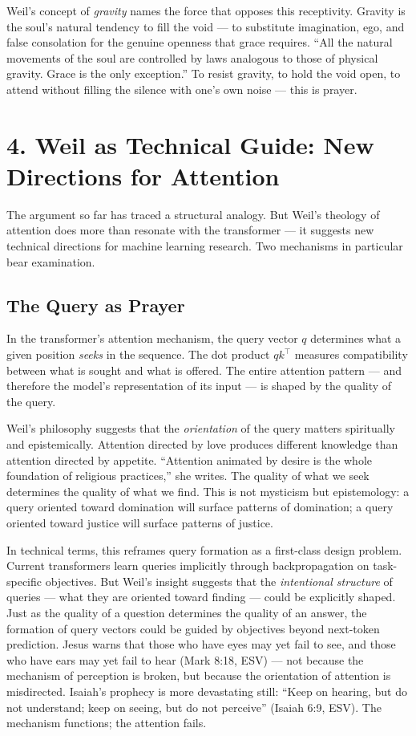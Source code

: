\documentclass[10pt, letterpaper, twocolumn]{article}
\begin{document}
Weil's concept of \emph{gravity} names the force that opposes this receptivity. Gravity is the soul's natural tendency to fill the void --- to substitute imagination, ego, and false consolation for the genuine openness that grace requires. ``All the natural movements of the soul are controlled by laws analogous to those of physical gravity. Grace is the only exception.'' To resist gravity, to hold the void open, to attend without filling the silence with one's own noise --- this is prayer.

\section*{4. Weil as Technical Guide: New Directions for Attention}\label{weil-as-technical-guide-new-directions-for-attention}

The argument so far has traced a structural analogy. But Weil's theology of attention does more than resonate with the transformer --- it suggests new technical directions for machine learning research. Two mechanisms in particular bear examination.

\subsection*{The Query as Prayer}\label{the-query-as-prayer}

In the transformer's attention mechanism, the query vector \(q\) determines what a given position \emph{seeks} in the sequence. The dot product \(qk^\top\) measures compatibility between what is sought and what is offered. The entire attention pattern --- and therefore the model's representation of its input --- is shaped by the quality of the query.

Weil's philosophy suggests that the \emph{orientation} of the query matters spiritually and epistemically. Attention directed by love produces different knowledge than attention directed by appetite. ``Attention animated by desire is the whole foundation of religious practices,'' she writes. The quality of what we seek determines the quality of what we find. This is not mysticism but epistemology: a query oriented toward domination will surface patterns of domination; a query oriented toward justice will surface patterns of justice.

In technical terms, this reframes query formation as a first-class design problem. Current transformers learn queries implicitly through backpropagation on task-specific objectives. But Weil's insight suggests that the \emph{intentional structure} of queries --- what they are oriented toward finding --- could be explicitly shaped. Just as the quality of a question determines the quality of an answer, the formation of query vectors could be guided by objectives beyond next-token prediction. Jesus warns that those who have eyes may yet fail to see, and those who have ears may yet fail to hear (Mark 8:18, ESV) --- not because the mechanism of perception is broken, but because the orientation of attention is misdirected. Isaiah's prophecy is more devastating still: ``Keep on hearing, but do not understand; keep on seeing, but do not perceive'' (Isaiah 6:9, ESV). The mechanism functions; the attention fails.
\end{document}
